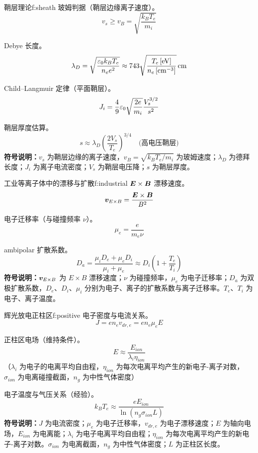 \begin{formulabox}{鞘层理论}{f:sheath}
玻姆判据（鞘层边缘离子速度）。
\[
    v_s \geq v_B = \sqrt{\frac{k_B T_e}{m_i}}
\]

Debye 长度。
\begin{equation}
    \lambda_D = \sqrt{\frac{\varepsilon_0 k_B T_e}{n_e e^2}} \approx 743\sqrt{\frac{T_e\,[\mathrm{eV}]}{n_e\,[\mathrm{cm^{-3}}]}}\,\mathrm{cm}
\label{eq:ch11-debye-length-ex}
\end{equation}

Child--Langmuir 定律（平面鞘层）。
\begin{equation}
    J_i = \frac{4}{9}\varepsilon_0 \sqrt{\frac{2e}{m_i}} \frac{V_s^{3/2}}{s^2}
\label{eq:ch11-child-langmuir-ex}
\end{equation}

鞘层厚度估算。
\[
    s \approx \lambda_D \left(\frac{2V_s}{T_e}\right)^{3/4} \quad\text{(高电压鞘层)}
\]
\textbf{符号说明：}$v_s$ 为鞘层边缘的离子速度，$v_B=\sqrt{k_BT_e/m_i}$ 为玻姆速度；$\lambda_D$ 为德拜长度；$J_i$ 为离子电流密度；$V_s$ 为鞘层电压降；$s$ 为鞘层厚度。
\end{formulabox}

\begin{formulabox}{工业等离子体中的漂移与扩散}{f:industrial}
$\bm{E}\times\bm{B}$ 漂移速度。
\[
    \bm{v}_{E\times B} = \frac{\bm{E}\times\bm{B}}{B^2}
\]

电子迁移率（与碰撞频率 $\nu$）。
\[
    \mu_e = \frac{e}{m_e \nu}
\]

ambipolar 扩散系数。
\[
    D_a = \frac{\mu_i D_e + \mu_e D_i}{\mu_i + \mu_e} \approx D_i\left(1+\frac{T_e}{T_i}\right)
\]
\textbf{符号说明：}$\bm{v}_{E\times B}$ 为 $E\times B$ 漂移速度；$\nu$ 为碰撞频率，$\mu_e$ 为电子迁移率；$D_a$ 为双极扩散系数，$D_e$、$D_i$、$\mu_i$ 分别为电子、离子的扩散系数与离子迁移率。$T_e$、$T_i$ 为电子、离子温度。
\end{formulabox}

\begin{formulabox}{辉光放电正柱区}{f:positive}
电子密度与电流关系。
\[
    J = e n_e v_{dr,e} = e n_e \mu_e E
\]

正柱区电场（维持条件）。
\[
    E \approx \frac{E_{ion}}{\lambda_i \eta_{ion}}
\]
（$\lambda_i$ 为电子的电离平均自由程，$\eta_{ion}$ 为每次电离平均产生的新电子-离子对数，$\sigma_{ion}$ 为电离碰撞截面，$n_g$ 为中性气体密度）

电子温度与气压关系（经验）。
\[
    k_B T_e \approx \frac{e E_{ion}}{\ln(n_g \sigma_{ion} L)}
\]
\textbf{符号说明：}$J$ 为电流密度；$\mu_e$ 为电子迁移率，$v_{dr,e}$ 为电子漂移速度；$E$ 为轴向电场，$E_{ion}$ 为电离能；$\lambda_i$ 为电子电离平均自由程；$\eta_{ion}$ 为每次电离平均产生的新电子-离子对数。$\sigma_{ion}$ 为电离截面，$n_g$ 为中性气体密度；$L$ 为正柱区长度。
\end{formulabox}

